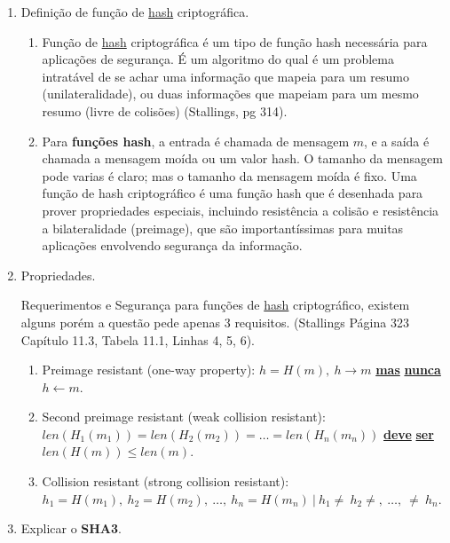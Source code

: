 \documentclass[conference]{IEEEtran}
\begin{document}
\begin{enumerate}

\item Definição de função de \underline{hash} criptográfica.

\begin{enumerate}
\item Função de \underline{hash} criptográfica é um tipo de função hash
necessária para aplicações de segurança. É um algoritmo do qual é um problema
intratável de se achar uma informação que mapeia para um resumo
(unilateralidade), ou duas informações que mapeiam para um mesmo resumo (livre
de colisões) (Stallings, pg 314).

\item Para \textbf{funções hash}, a entrada é chamada de mensagem $m$, e a saída
é chamada a mensagem moída ou um valor hash. O tamanho da mensagem pode varias é
claro; mas o tamanho da mensagem moída é fixo. Uma função de hash criptográfico
é uma função hash que é desenhada para prover propriedades especiais, incluindo
resistência a colisão e resistência a bilateralidade (preimage), que são
importantíssimas para muitas aplicações envolvendo segurança da informação.
\end{enumerate}

\item Propriedades.

Requerimentos e Segurança para funções de \underline{hash} criptográfico,
existem alguns porém a questão pede apenas 3  requisitos. (Stallings Página 323
Capítulo 11.3, Tabela 11.1,  Linhas 4, 5, 6).

\begin{enumerate}
\item Preimage resistant (one-way property): $h = H(m),\ h \rightarrow m$ 
\underline{\color{red} \textbf{mas}} \underline{\color{red} \textbf{nunca}} $h 
\leftarrow m$.

\item Second preimage resistant (weak collision resistant): $len(H_1(m_1)) = 
len(H_2(m_2)) = \ldots = len(H_n(m_n))$ \underline{\color{red} \textbf{deve}} 
\underline{\color{red} \textbf{ser}} $len(H(m)) \le len(m)$.

\item Collision resistant (strong collision resistant): $h_1 = H(m_1),\ 
h_2=H(m_2),\ \ldots,\ h_n=H(m_n)\  \vert\ h_1 \not=\ h_2 \not=,\ \ldots,\ 
\not=\ h_n$.
\end{enumerate}

\item Explicar o \textbf{SHA3}.


\end{enumerate}
\end{document}
